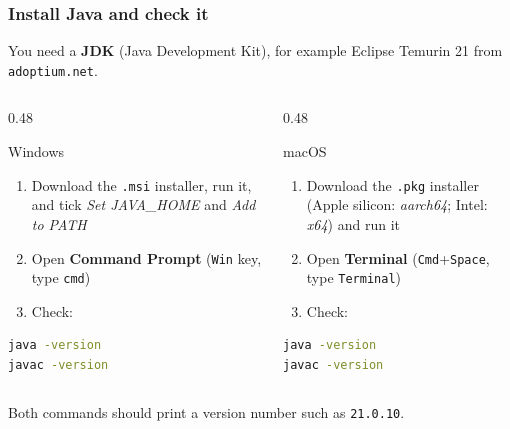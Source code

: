 \documentclass[aspectratio=169,10pt,compress]{beamer}
\begin{document}
\begin{frame}[t,fragile] \frametitle{Install Java and check it}
  \small You need a \textbf{JDK} (Java Development Kit), for example Eclipse Temurin 21 from \texttt{adoptium.net}.
  \begin{columns}[T]
    \begin{column}{0.48\textwidth}
      \begin{block}{Windows}
        \footnotesize
        \begin{enumerate}
          \item Download the \texttt{.msi} installer, run it, and tick \emph{Set JAVA\_HOME} and \emph{Add to PATH}
          \item Open \textbf{Command Prompt} (\texttt{Win} key, type \texttt{cmd})
          \item Check:
        \end{enumerate}


\begin{lstlisting}[style=codesnippet, language=bash]
java -version
javac -version
\end{lstlisting}



      \end{block}
    \end{column}
    \begin{column}{0.48\textwidth}
      \begin{block}{macOS}
        \footnotesize
        \begin{enumerate}
          \item Download the \texttt{.pkg} installer (Apple silicon: \emph{aarch64}; Intel: \emph{x64}) and run it
          \item Open \textbf{Terminal} (\texttt{Cmd}+\texttt{Space}, type \texttt{Terminal})
          \item Check:
        \end{enumerate}


\begin{lstlisting}[style=codesnippet, language=bash]
java -version
javac -version
\end{lstlisting}



      \end{block}
    \end{column}
  \end{columns}
  \small Both commands should print a version number such as \texttt{21.0.10}.
\end{frame}
\end{document}
